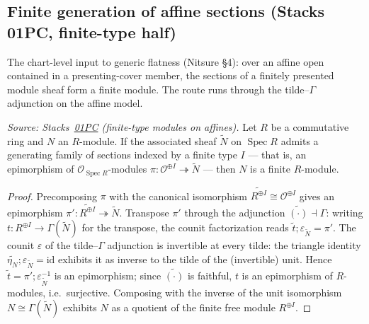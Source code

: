 \subsection{Finite generation of affine sections (Stacks 01PC, finite-type half)}

The chart-level input to generic flatness (Nitsure \S4): over an affine open
contained in a presenting-cover member, the sections of a finitely presented
module sheaf form a finite module. The route runs through the tilde--$\Gamma$
adjunction on the affine model.

\begin{lemma}
  \label{mk-lem:module_finite_of_tilde_genSections}
  \leanok

  \textit{Source: Stacks~\href{https://stacks.math.columbia.edu/tag/01PC}{01PC}
  (finite-type modules on affines).}
  Let \(R\) be a commutative ring and \(N\) an \(R\)-module. If the associated
  sheaf \(\widetilde N\) on \(\operatorname{Spec} R\) admits a generating
  family of sections indexed by a finite type \(I\) — that is, an epimorphism
  of \(\mathcal O_{\operatorname{Spec} R}\)-modules
  \(\pi : \mathcal O^{\oplus I} \twoheadrightarrow \widetilde N\) — then \(N\)
  is a finite \(R\)-module.
\end{lemma}
\begin{proof}
  \leanok
  Precomposing \(\pi\) with the canonical isomorphism
  \(\widetilde{R^{\oplus I}} \cong \mathcal O^{\oplus I}\) gives an epimorphism
  \(\pi' : \widetilde{R^{\oplus I}} \twoheadrightarrow \widetilde N\).
  Transpose \(\pi'\) through the adjunction
  \(\widetilde{(\cdot)} \dashv \Gamma\): writing
  \(t : R^{\oplus I} \to \Gamma(\widetilde N)\) for the transpose,
  the counit factorization reads
  \(\widetilde{t} \mathbin{;} \varepsilon_{\widetilde N} = \pi'\).
  The counit \(\varepsilon\) of the tilde--\(\Gamma\) adjunction is invertible
  at every tilde: the triangle identity
  \(\widetilde{\eta_N} \mathbin{;} \varepsilon_{\widetilde N} = \mathrm{id}\)
  exhibits it as inverse to the tilde of the (invertible) unit. Hence
  \(\widetilde t = \pi' \mathbin{;} \varepsilon_{\widetilde N}^{-1}\) is an
  epimorphism; since \(\widetilde{(\cdot)}\) is faithful, \(t\) is an
  epimorphism of \(R\)-modules, i.e.\ surjective. Composing with the inverse
  of the unit isomorphism \(N \cong \Gamma(\widetilde N)\) exhibits \(N\) as a
  quotient of the finite free module \(R^{\oplus I}\).
\end{proof}

